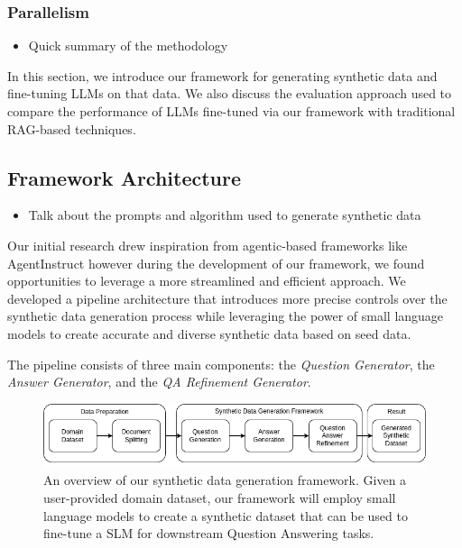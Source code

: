 \subsubsection{Parallelism}


\begin{itemize}
  \item Quick summary of the methodology
\end{itemize}

In this section, we introduce our framework for generating synthetic data and fine-tuning LLMs on that data.
We also discuss the evaluation approach used to compare the performance of LLMs fine-tuned via our framework
with traditional RAG-based techniques.


\subsection{Framework Architecture}
\begin{itemize}
  \item Talk about the prompts and algorithm used to generate synthetic data
\end{itemize}

Our initial research drew inspiration from agentic-based frameworks like AgentInstruct %
however during the development of our framework, we found opportunities to leverage a more streamlined and efficient approach.
We developed a pipeline architecture that introduces more precise controls over the
synthetic data generation process while leveraging the power of small language models to create accurate
and diverse synthetic data based on seed data.

The pipeline consists of three main components: the \textit{Question Generator}, the \textit{Answer Generator}, and the \textit{QA Refinement Generator}.

\begin{figure}[h]
  \centering
  \includegraphics[width=\textwidth]{methodology-overview.png}
  \caption{An overview of our synthetic data generation framework. Given a user-provided domain dataset, our
framework will employ small language models to create a synthetic dataset that can be used
to fine-tune a SLM for downstream Question Answering tasks.}
\end{figure}

